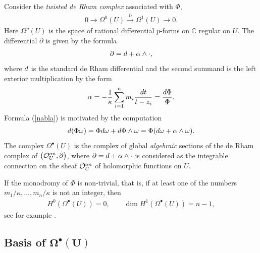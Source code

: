 \documentclass[11pt]{article}
\numberwithin{equation}{section}
\begin{document}
Consider the {\em twisted de Rham complex} associated with $\Phi$,
\begin{gather}\label{dr com}
0\longrightarrow \Omega^0(U)\overset{\partial}{\longrightarrow}\Omega^1(U) \longrightarrow 0.
\end{gather}
Here $\Omega^p(U)$ is the space of rational differential $p$-forms on ${\mathbb C}$ regular on $U$. The differential $\partial$ is given by the formula
\begin{gather}\label{nabla}
\partial={\rm d}+\alpha\wedge\cdot ,
\end{gather}
where ${\rm d}$ is the standard de Rham differential and the second summand is the left exterior multiplication by the form
\begin{gather*}%
\alpha=-\frac{1}{\kappa}\sum_{i=1}^n m_i \frac{{\rm d}t}{t-z_i} =\frac{{\rm d}\Phi}\Phi.
\end{gather*}
Formula (\ref{nabla}) is motivated by the computation
\begin{gather*}
{\rm d}(\Phi\omega)=\Phi {\rm d}\omega+{\rm d}\Phi\wedge\omega=\Phi({\rm d}\omega+\alpha\wedge\omega).
\end{gather*}
The complex $\Omega^{\bullet}(U)$ is the complex of global {\em algebraic} sections of
the de Rham complex of $\big({\mathcal{O}}^{\rm an}_U,\partial\big)$, where $\partial={\rm d}+\alpha\wedge\cdot$ is considered as the integrable connection on the sheaf ${\mathcal{O}}^{\rm an}_U$ of holomorphic functions on $U$.

If the monodromy of $\Phi$ is non-trivial, that is, if at least one of the numbers $m_1/\kappa, \dots, m_n/\kappa$ is not an integer, then
\begin{gather*}
H^0(\Omega^{\bullet}(U))=0,\qquad \dim H^1(\Omega^{\bullet}(U))=n-1,
\end{gather*}
see for example \cite{STV}.

\subsection[Basis of $\Omega^{\bullet}(U)$]{Basis of $\boldsymbol{\Omega^{\bullet}(U)}$} \label{Basis of Omega}
\end{document}

